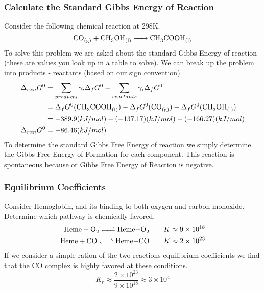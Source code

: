 \documentclass{article}
\begin{document}
\subsubsection*{Calculate the Standard Gibbs Energy of Reaction}
Consider the following chemical reaction at 298K.
\begin{equation}
    \ce{CO_{(g)} + CH3OH_{(l)} -> CH3COOH_{(l)}}
\end{equation}
To solve this problem we are asked about the standard Gibbs Energy of reaction (these are values you look up in a table to solve). 
We can break up the problem into products - reactants (based on our sign convention). 
\begin{equation}
\begin{split}
    \Delta_{rxn}G^0 &= \sum_{products} \gamma_i\Delta_fG^0 - \sum_{reactants}\gamma_i\Delta_fG^0\\
    & = \Delta_fG^0(\ce{CH3COOH_{(l)}}) - \Delta_fG^0(\ce{CO_{(g)}}) - \Delta_fG^0(\ce{CH3OH_{(l)}}) \\
    &= -389.9 (kJ/mol) - (-137.17) (kJ/mol) - (-166.27) (kJ/mol) \\
    \Delta_{rxn}G^0 &= -86.46 (kJ/mol)
    \end{split}
\end{equation}
To determine the standard Gibbs Free Energy of reaction we simply determine the Gibbs Free Energy of Formation for each component. 
This reaction is spontaneous because or Gibbs Free Energy of Reaction is negative. 

\subsubsection*{Equilibrium Coefficients}
Consider Hemoglobin, and its binding to both oxygen and carbon monoxide. 
Determine which pathway is chemically favored. 
\begin{equation}
\begin{split}
\ce{Heme + O2 <=> Heme-O2} \qquad K \approx 9\times 10^{18}\\
\ce{Heme + CO <=> Heme-CO} \qquad K \approx 2\times 10^{23}
\end{split}
\end{equation}
If we consider a simple ration of the two reactions equilibrium coefficients we find that the CO complex is highly favored at these conditions. 
\begin{equation}
K_r \approx \frac{2\times 10^{23}}{9\times 10^{18}} \approx 3\times10^4
\end{equation}
\end{document}
